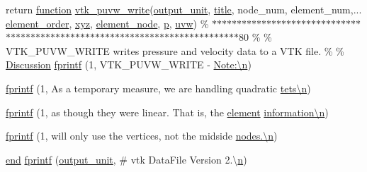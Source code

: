 \begin{DoxyCompactItemize}
return \hyperlink{a00611_a2420833d971716e9bab41cc9fb3abba1}{function} \hyperlink{a00611_a820b061ee96c178a7c94b48c0189d2ef}{vtk\+\_\+puvw\+\_\+write}(\hyperlink{a00614_a21b113ecd24e6ae8a92fa4a149ad8701}{output\+\_\+unit}, \hyperlink{a00617_a051e403214cb6872ad3fe4e50302a6ee}{title}, node\+\_\+num, element\+\_\+num,... \hyperlink{a00611_aa77ee84ffb15118601acbd018f243edc}{element\+\_\+order}, \hyperlink{a00614_a6444a221e6b74abaf6d67d44af2650a0}{xyz}, \hyperlink{a00614_a50df015479692caa32ea5ed86939881e}{element\+\_\+node}, \hyperlink{a00614_a1e0420801cd5156c14e085b87a4945f5}{p}, \hyperlink{a00614_ac062c50cc1b43901b7ea410ae1ff3be9}{uvw}) \% $\ast$$\ast$$\ast$$\ast$$\ast$$\ast$$\ast$$\ast$$\ast$$\ast$$\ast$$\ast$$\ast$$\ast$$\ast$$\ast$$\ast$$\ast$$\ast$$\ast$$\ast$$\ast$$\ast$$\ast$$\ast$$\ast$$\ast$$\ast$$\ast$$\ast$$\ast$$\ast$$\ast$$\ast$$\ast$$\ast$$\ast$$\ast$$\ast$$\ast$$\ast$$\ast$$\ast$$\ast$$\ast$$\ast$$\ast$$\ast$$\ast$$\ast$$\ast$$\ast$$\ast$$\ast$$\ast$$\ast$$\ast$$\ast$$\ast$$\ast$$\ast$$\ast$$\ast$$\ast$$\ast$$\ast$$\ast$$\ast$$\ast$$\ast$$\ast$$\ast$$\ast$$\ast$$\ast$$\ast$$\ast$80 \% \% V\+T\+K\+\_\+\+P\+U\+V\+W\+\_\+\+W\+R\+I\+TE writes pressure and velocity data to a V\+TK file. \% \% \hyperlink{a00611_afb022d1087d237270af4fbdcc4cce30e}{Discussion} \hyperlink{a00611_a6c6688dfddffd8675bd8128e0abad9be}{fprintf} (1, \textquotesingle{}V\+T\+K\+\_\+\+P\+U\+V\+W\+\_\+\+W\+R\+I\+TE -\/ \hyperlink{a00623_a781a04ab095280f838ff3eb0e51312e0}{Note\+:\textbackslash{}n}\textquotesingle{})
\item 
\hyperlink{a00611_afdbca82e8254187eadd7c66d61051c3c}{fprintf} (1, \textquotesingle{} As a temporary measure, we are handling quadratic \hyperlink{a00623_a781a04ab095280f838ff3eb0e51312e0}{tets\textbackslash{}n}\textquotesingle{})
\item 
\hyperlink{a00611_a0672b80aa498898958de53816064db5c}{fprintf} (1, \textquotesingle{} as though they were linear. That is, the \hyperlink{a00611_a4998e7f4989562d1ed06579e07265c30}{element} \hyperlink{a00623_a781a04ab095280f838ff3eb0e51312e0}{information\textbackslash{}n}\textquotesingle{})
\item 
\hyperlink{a00611_a843e5b25fce87fd15e0c43845953f501}{fprintf} (1, \textquotesingle{} will only use the vertices, not the midside \hyperlink{a00623_a781a04ab095280f838ff3eb0e51312e0}{nodes.\textbackslash{}n}\textquotesingle{})
\item 
\hyperlink{a00608_afb358f48b1646c750fb9da6c6585be2b}{end} \hyperlink{a00611_a456c85d7c501c0ac56856b697d597aa4}{fprintf} (\hyperlink{a00614_a21b113ecd24e6ae8a92fa4a149ad8701}{output\+\_\+unit}, \textquotesingle{}\# vtk Data\+File Version 2.\textbackslash{}\hyperlink{a00623_a781a04ab095280f838ff3eb0e51312e0}{n}\textquotesingle{})

\end{DoxyCompactItemize}
